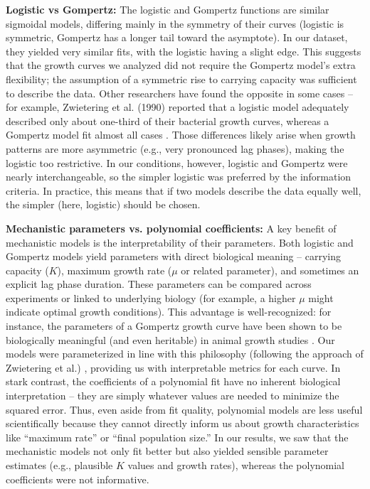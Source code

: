 \documentclass[11pt]{article}
\begin{document}
\textbf{Logistic vs Gompertz:} The logistic and Gompertz functions are similar sigmoidal models, differing mainly in the symmetry of their curves (logistic is symmetric, Gompertz has a longer tail toward the asymptote). In our dataset, they yielded very similar fits, with the logistic having a slight edge. This suggests that the growth curves we analyzed did not require the Gompertz model’s extra flexibility; the assumption of a symmetric rise to carrying capacity was sufficient to describe the data. Other researchers have found the opposite in some cases – for example, Zwietering et al. (1990) reported that a logistic model adequately described only about one-third of their bacterial growth curves, whereas a Gompertz model fit almost all cases \citep{ZwieteringEtAl1990}. Those differences likely arise when growth patterns are more asymmetric (e.g., very pronounced lag phases), making the logistic too restrictive. In our conditions, however, logistic and Gompertz were nearly interchangeable, so the simpler logistic was preferred by the information criteria. In practice, this means that if two models describe the data equally well, the simpler (here, logistic) should be chosen.

\textbf{Mechanistic parameters vs. polynomial coefficients:} A key benefit of mechanistic models is the interpretability of their parameters. Both logistic and Gompertz models yield parameters with direct biological meaning – carrying capacity ($K$), maximum growth rate ($\mu$ or related parameter), and sometimes an explicit lag phase duration. These parameters can be compared across experiments or linked to underlying biology (for example, a higher $\mu$ might indicate optimal growth conditions). This advantage is well-recognized: for instance, the parameters of a Gompertz growth curve have been shown to be biologically meaningful (and even heritable) in animal growth studies \citep{GrasteauEtAl2000}. Our models were parameterized in line with this philosophy (following the approach of Zwietering et al.) \citep{ZwieteringEtAl1990}, providing us with interpretable metrics for each curve. In stark contrast, the coefficients of a polynomial fit have no inherent biological interpretation – they are simply whatever values are needed to minimize the squared error. Thus, even aside from fit quality, polynomial models are less useful scientifically because they cannot directly inform us about growth characteristics like “maximum rate” or “final population size.” In our results, we saw that the mechanistic models not only fit better but also yielded sensible parameter estimates (e.g., plausible $K$ values and growth rates), whereas the polynomial coefficients were not informative.
\end{document}
